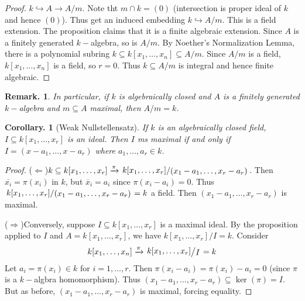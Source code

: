 \documentclass[11pt, a4paper]{memoir}
\newcommand{\impr}{{($\Rightarrow$)\hspace{0.2cm}}}
\newcommand{\impl}{{($\Leftarrow$)\hspace{0.2cm}}}
\newcommand{\fto}[1]{\ensuremath{\xrightarrow{\scriptstyle{#1}}}}
\newcommand{\hto}[0]{\ensuremath{\hookrightarrow}}
\theoremstyle{change}
\newtheorem{corollary}[theorem]{Corollary.}
\theoremstyle{plain}
\theoremstyle{nonumberplain}
\newtheorem{remark}{Remark.}
\newtheorem{proof}{Proof}
\newcommand{\quot}[2]{\mathchoice{\left.\raisebox{0.10em}{$#1$}\middle/\raisebox{-0.10em}{$#2$}\right.}
                                 {\left.\raisebox{0.04em}{$#1$}\middle/\raisebox{-0.04em}{$#2$}\right.}
                                 {\left.\raisebox{0.01em}{$#1$}\middle/\raisebox{-0.01em}{$#2$}\right.}
                                 {\left.\raisebox{0em}{$#1$}\middle/\raisebox{0em}{$#2$}\right.}}
\numberwithin{equation}{section}
\begin{document}
\begin{proof}
    $k\hto A\to A/m$.
    Note tht $m\cap k = (0)$ (intersection is proper ideal of $k$ and hence $(0)$).
    Thus get an induced embedding $k\hookrightarrow A/m$.
    This is a field extension.
    The proposition claims that it is a finite algebraic extension.
    Since $A$ is a finitely generated $k-$algebra, so is $A/m$.
    By Noether's Normalization Lemma, there is a polynomial subring $k\subseteq k[x_1,\ldots,x_n]\subseteq A/m$.
    Since $A/m$ is a field, $k[x_1,\ldots,x_n]$ is a field, so $r=0$.
    Thus $k\subseteq A/m$ is integral and hence finite algebraic.
\end{proof}
\begin{remark}
    In particular, if $k$ is algebraically closed and $A$ is a finitely generated $k-$algebra and $m\subseteq A$ maximal, then $A/m=k$.
\end{remark}
\begin{corollary}[Weak Nullstellensatz]
    If $k$ is an algebraically closed field, $I\subseteq k[x_1,\ldots,x_r]$ is an ideal.
    Then $I$ ms maximal if and only if $I=(x-a_1,\ldots,x-a_r)$ where $a_1,\ldots,a_r\in k$.
\end{corollary}
\begin{proof}
    \impl $k\subseteq k[x_1,\ldots,x_r]\fto{\pi}\quot{k[x_1,\ldots,x_r]}{(x_1-a_1,\ldots,x_r-a_r)}$.
    Then $\overline{x_i}=\pi(x_i)$ in $k$, but $\overline{x}_i=a_i$ since $\pi(x_i-a_i)=0$.
    Thus $\quot{k[x_1,\ldots,x_r]}{(x_1-a_1,\ldots,x_r-a_r)}=k$ a field.
    Then $(x_1-a_1,\ldots,x_r-a_r)$ is maximal.

    \impr Conversely, suppose $I\subseteq k[x_1,\ldots,x_r]$ is a maximal ideal.
    By the proposition applied to $I$ and $A=k[x_1,\ldots,x_r]$, we have $k[x_1,\dots,x_r]/I=k$.
    Consider
    \begin{equation*}
        k[x_1,\ldots,x_n]\fto{\pi}\quot{k[x_1,\ldots,x_r]}{I}=k
    \end{equation*}
    Let $a_i=\pi(x_i)\in k$ for $i=1,\ldots,r$.
    Then $\pi(x_i-a_i)=\pi(x_i)-a_i=0$ (since $\pi$ is a $k-$algbra homomorphism).
    Thus $(x_1-a_1,\ldots,x_r-a_r)\subseteq\ker(\pi)=I$.
    But as before, $(x_1-a_1,\ldots,x_r-a_r)$ is maximal, forcing equality.
\end{proof}
\end{document}
